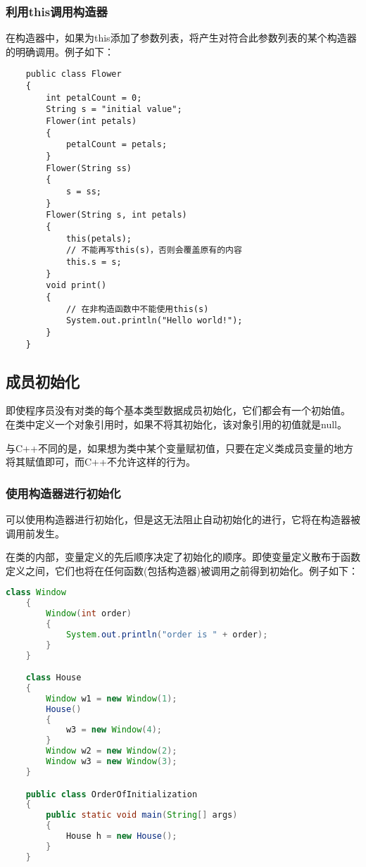 \documentclass[a4paper,left=2.5cm,right=2.5cm,11pt]{article}
\begin{document}
\subsubsection{利用this调用构造器}
	在构造器中，如果为this添加了参数列表，将产生对符合此参数列表的某个构造器的明确调用。例子如下：
	\begin{lstlisting}
	public class Flower
	{
		int petalCount = 0;
		String s = "initial value";
		Flower(int petals)
		{
			petalCount = petals;
		}
		Flower(String ss)
		{
			s = ss;
		}
		Flower(String s, int petals)
		{
			this(petals);
			// 不能再写this(s)，否则会覆盖原有的内容
			this.s = s;
		}
		void print()
		{
			// 在非构造函数中不能使用this(s)
			System.out.println("Hello world!");
		}
	}
	\end{lstlisting}

\subsection{成员初始化}
	即使程序员没有对类的每个基本类型数据成员初始化，它们都会有一个初始值。
	在类中定义一个对象引用时，如果不将其初始化，该对象引用的初值就是null。\par
	与C++不同的是，如果想为类中某个变量赋初值，只要在定义类成员变量的地方将其赋值即可，而C++不允许这样的行为。

\subsubsection{使用构造器进行初始化}
	可以使用构造器进行初始化，但是这无法阻止自动初始化的进行，它将在构造器被调用前发生。\par
	在类的内部，变量定义的先后顺序决定了初始化的顺序。即使变量定义散布于函数定义之间，它们也将在任何函数(包括构造器)被调用之前得到初始化。例子如下：
	\begin{lstlisting}[language = Java]
	class Window
	{
		Window(int order)
		{
			System.out.println("order is " + order);
		}
	}

	class House
	{
		Window w1 = new Window(1);
		House()
		{
			w3 = new Window(4);
		}
		Window w2 = new Window(2);
		Window w3 = new Window(3);
	}

	public class OrderOfInitialization
	{
		public static void main(String[] args)
		{
			House h = new House();
		}
	}
	\end{lstlisting}
\end{document}
